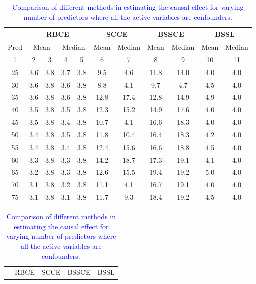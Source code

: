\documentclass[preprint,12pt]{elsarticle}
\newcommand{\added}[1]{\textcolor{blue}{#1}}
\begin{document}
\begin{table}[ht]
	\tiny
	\centering
	\caption{\added{Comparison of different methods in estimating the causal effect for varying number of predictors where all the active variables are confounders.}}
	\label{tab:causal2a}
	\begin{tabular}{c|cccc|cc|cc|cc}
		\hline
		\multicolumn{1}{l|}{}&
		\multicolumn{4}{c|}{RBCE}&
		\multicolumn{2}{c|}{SCCE}&
		\multicolumn{2}{c|}{BSSCE}&
		\multicolumn{2}{c}{BSSL}\\
		\hline
		\multicolumn{1}{c|}{Pred}&
		\multicolumn{2}{c}{Mean}&
		\multicolumn{2}{c|}{Median}&
		\multicolumn{1}{c}{Mean}&
		\multicolumn{1}{c|}{Median}&
		\multicolumn{1}{c}{Mean}&
		\multicolumn{1}{c|}{Median}&
		\multicolumn{1}{c}{Mean}&
		\multicolumn{1}{c}{Median}\\
		\hline
		1 & 2 & 3 & 4 & 5 & 6 & 7 & 8 & 9 & 10 & 11 \\ 
		\hline
		25 & 3.6 & 3.8 & 3.7 & 3.8 & 9.5 & 4.6 & 11.8 & 14.0 & 4.0 & 4.0 \\ 
		30 & 3.6 & 3.8 & 3.6 & 3.8 & 8.8 & 4.1 & 9.7 & 4.7 & 4.5 & 4.0 \\ 
		35 & 3.6 & 3.8 & 3.6 & 3.8 & 12.8 & 17.4 & 12.8 & 14.9 & 4.9 & 4.0 \\ 
		40 & 3.5 & 3.8 & 3.5 & 3.8 & 12.3 & 15.2 & 14.9 & 17.6 & 4.0 & 4.0 \\ 
		45 & 3.5 & 3.8 & 3.4 & 3.8 & 10.7 & 4.1 & 16.6 & 18.3 & 4.0 & 4.0 \\ 
		50 & 3.4 & 3.8 & 3.5 & 3.8 & 11.8 & 10.4 & 16.4 & 18.3 & 4.2 & 4.0 \\ 
		55 & 3.4 & 3.8 & 3.4 & 3.8 & 12.4 & 15.6 & 16.6 & 18.8 & 4.5 & 4.0 \\ 
		60 & 3.3 & 3.8 & 3.3 & 3.8 & 14.2 & 18.7 & 17.3 & 19.1 & 4.1 & 4.0 \\ 
		65 & 3.2 & 3.8 & 3.3 & 3.8 & 12.6 & 15.5 & 19.4 & 19.2 & 5.0 & 4.0 \\ 
		70 & 3.1 & 3.8 & 3.2 & 3.8 & 11.1 & 4.1 & 16.7 & 19.1 & 4.0 & 4.0 \\ 
		75 & 3.1 & 3.8 & 3.1 & 3.8 & 11.7 & 9.3 & 18.4 & 19.2 & 4.5 & 4.0 \\ 
		\hline
	\end{tabular}
	\begin{tabular}{c|rrrrr|rrr|rrr|rrr}
		\hline
		\multicolumn{1}{l|}{}&
		\multicolumn{5}{c|}{RBCE}&
		\multicolumn{3}{c|}{SCCE}&
		\multicolumn{3}{c|}{BSSCE}&
		\multicolumn{3}{c}{BSSL}\\

\end{tabular}
\end{table}
\end{document}
